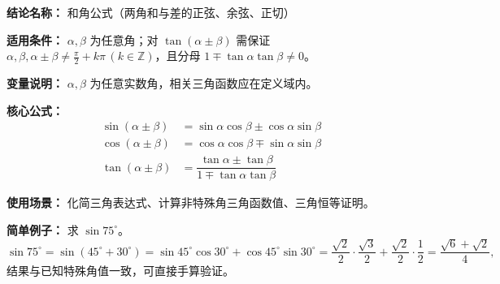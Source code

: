 \textbf{结论名称：} 和角公式（两角和与差的正弦、余弦、正切）

\textbf{适用条件：} $\alpha,\beta$ 为任意角；对 $\tan(\alpha\pm\beta)$ 需保证 $\alpha,\beta,\alpha\pm\beta \neq \frac{\pi}{2}+k\pi\,(k\in\mathbb{Z})$，且分母 $1\mp\tan\alpha\tan\beta\neq0$。

\textbf{变量说明：} $\alpha,\beta$ 为任意实数角，相关三角函数应在定义域内。

\textbf{核心公式：}
\[
\boxed{
\begin{aligned}
\sin(\alpha\pm\beta) &= \sin\alpha\cos\beta \pm \cos\alpha\sin\beta \\[2pt]
\cos(\alpha\pm\beta) &= \cos\alpha\cos\beta \mp \sin\alpha\sin\beta \\[2pt]
\tan(\alpha\pm\beta) &= \dfrac{\tan\alpha \pm \tan\beta}{1 \mp \tan\alpha\tan\beta}
\end{aligned}
}
\]

\textbf{使用场景：} 化简三角表达式、计算非特殊角三角函数值、三角恒等证明。

\textbf{简单例子：} 求 $\sin 75^\circ$。
\[
\sin 75^\circ = \sin(45^\circ + 30^\circ) = \sin45^\circ\cos30^\circ + \cos45^\circ\sin30^\circ
= \frac{\sqrt{2}}{2}\cdot\frac{\sqrt{3}}{2} + \frac{\sqrt{2}}{2}\cdot\frac{1}{2}
= \frac{\sqrt{6}+\sqrt{2}}{4},
\]
结果与已知特殊角值一致，可直接手算验证。